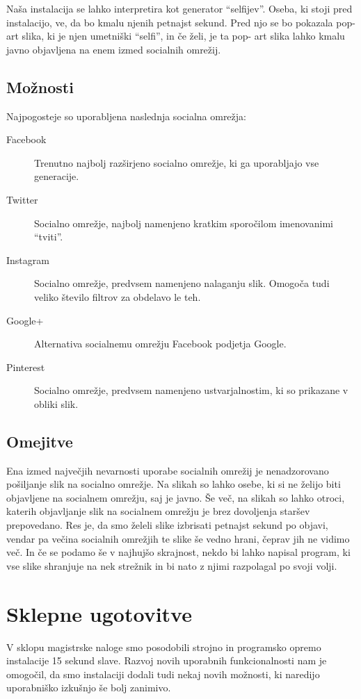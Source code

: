 Naša instalacija se lahko interpretira kot generator ``selfijev''. Oseba, ki
stoji pred instalacijo, ve, da bo kmalu njenih petnajst sekund. Pred njo se bo
pokazala pop-art slika, ki je njen umetniški ``selfi'', in če želi, je ta pop-
art slika lahko kmalu javno objavljena na enem izmed socialnih omrežij.


\section{Možnosti}
Najpogosteje so uporabljena naslednja socialna omrežja:
\begin{description}
\item[Facebook]
Trenutno najbolj razširjeno socialno omrežje, ki ga uporabljajo vse
generacije.

\item[Twitter]
Socialno omrežje, najbolj namenjeno kratkim sporočilom imenovanimi ``tviti''.

\item[Instagram]
Socialno omrežje, predvsem namenjeno nalaganju slik. Omogoča tudi veliko
število filtrov za obdelavo le teh.

\item[Google+]
Alternativa socialnemu omrežju Facebook podjetja Google.

\item[Pinterest]
Socialno omrežje, predvsem namenjeno ustvarjalnostim, ki so prikazane v obliki
slik.
\end{description}


\section{Omejitve}
Ena izmed največjih nevarnosti uporabe socialnih omrežij je nenadzorovano
pošiljanje slik na socialno omrežje. Na slikah so lahko osebe, ki si ne želijo
biti objavljene na socialnem omrežju, saj je javno. Še več, na slikah so lahko
otroci, katerih objavljanje slik na socialnem omrežju je brez dovoljenja
staršev prepovedano. Res je, da smo želeli slike izbrisati petnajst sekund po
objavi, vendar pa večina socialnih omrežjih te slike še vedno hrani, čeprav
jih ne vidimo več. In če se podamo še v najhujšo skrajnost, nekdo bi lahko
napisal program, ki vse slike shranjuje na nek strežnik in bi nato z njimi
razpolagal po svoji volji.


\chapter{Sklepne ugotovitve}
V sklopu magistrske naloge smo posodobili strojno in programsko opremo
instalacije 15 sekund slave. Razvoj novih uporabnih funkcionalnosti nam je
omogočil, da smo instalaciji dodali tudi nekaj novih možnosti, ki naredijo
uporabniško izkušnjo še bolj zanimivo.

